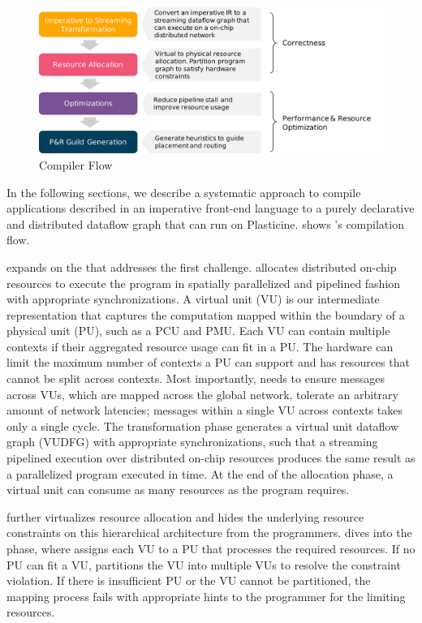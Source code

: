 \begin{figure}
\centering
\includegraphics[width=1\textwidth]{figs/sarastack.pdf}
\caption[\name Compiler Flow]{\name Compiler Flow}
\label{fig:flow}
\end{figure}
 
In the following sections, we describe a systematic approach to compile applications described in an
imperative front-end language to a purely declarative and distributed dataflow graph that can
run on Plasticine.  shows \name's compilation flow.

 expands on the  that
addresses the first challenge.
\name allocates distributed on-chip resources to execute the program in spatially parallelized and
pipelined fashion with appropriate synchronizations.
A virtual unit (VU) is our intermediate representation that captures the computation mapped
within the boundary of a physical unit (PU), such as a PCU and PMU.
Each VU can contain multiple contexts if their aggregated resource usage can fit in a PU.
The hardware can limit the maximum number of contexts a PU can support and has resources that cannot be split across contexts.
Most importantly, \name needs to ensure messages across VUs, which are mapped across the global network, tolerate an arbitrary amount of network latencies; messages within a single VU across contexts takes only a single cycle.
The transformation phase generates a virtual unit dataflow graph (VUDFG) with appropriate
synchronizations, such that a streaming pipelined execution over distributed on-chip resources produces the same result as a
parallelized program executed in time.
At the end of the allocation phase, a virtual unit can consume as many resources as the program
requires. 

\name further virtualizes resource allocation and hides the underlying resource constraints on
this hierarchical architecture from the programmers.
 dives into the  phase, where \name assigns each VU to a
PU that processes the required resources. If no PU can fit a VU, \name partitions the
VU into multiple VUs to resolve the constraint violation. If there is insufficient PU or the VU cannot be partitioned, the mapping process fails with appropriate hints to the programmer for the
limiting resources.

